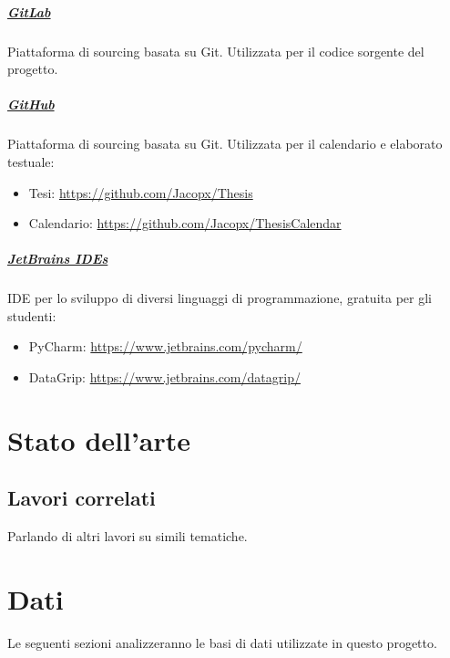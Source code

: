 \documentclass[%
    corpo=12pt,
    twoside,
    oldstyle,
    autoretitolo,
    greek,
    evenboxes,
]{toptesi}
\begin{document}
\paragraph{\href{https://gitlab.com}{GitLab}} Piattaforma di sourcing basata su Git. Utilizzata per il codice sorgente del progetto.

\paragraph{\href{https://github.com}{GitHub}} Piattaforma di sourcing basata su Git. Utilizzata per il calendario e elaborato testuale:
\begin{itemize}
  \item Tesi: \url{https://github.com/Jacopx/Thesis}
  \item Calendario: \url{https://github.com/Jacopx/ThesisCalendar}
\end{itemize}

\paragraph{\href{https://www.jetbrains.com/}{JetBrains IDEs}} IDE per lo sviluppo di diversi linguaggi di programmazione, gratuita per gli studenti:
\begin{itemize}
  \item PyCharm: \url{https://www.jetbrains.com/pycharm/}
  \item DataGrip: \url{https://www.jetbrains.com/datagrip/}
\end{itemize}

\chapter{Stato dell'arte}
\section{Lavori correlati}
Parlando di altri lavori su simili tematiche.


\chapter{Dati}
\label{chap:dataset}
Le seguenti sezioni analizzeranno le basi di dati utilizzate in questo progetto.
\end{document}
